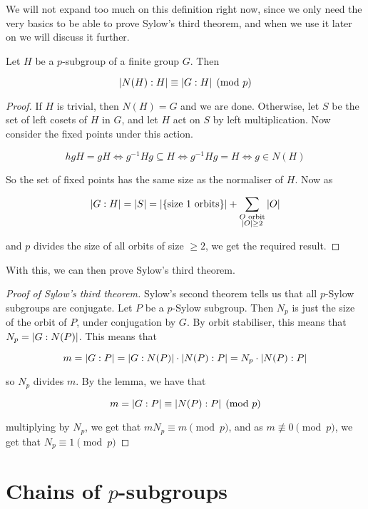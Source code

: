 \documentclass{article}
\begin{document}
    We will not expand too much on this definition right now, since we only need the very basics to be able to prove Sylow's third theorem, and when we use it later on we will discuss it further.

    \begin{lemma*}
        Let $H$ be a $p$-subgroup of a finite group $G$. Then

        $$\abs{N(H) : H} \equiv \abs{G : H} \pmod p$$
    \end{lemma*}

    \begin{proof}
        If $H$ is trivial, then $N(H) = G$ and we are done. Otherwise, let $S$ be the set of left cosets of $H$ in $G$, and let $H$ act on $S$ by left multiplication. Now consider the fixed points under this action.

        $$hgH = gH \iff g^{-1}Hg \subseteq H \iff g^{-1}Hg = H \iff g \in N(H)$$

        So the set of fixed points has the same size as the normaliser of $H$. Now as

        $$\abs{G : H} = \abs{S} = \abs{\{\text{size }1\text{ orbits}\}} + \sum_{\substack{O \text{ orbit} \\ \abs{O} \ge 2}}\abs{O}$$

        and $p$ divides the size of all orbits of size $\ge 2$, we get the required result.
    \end{proof}

    With this, we can then prove Sylow's third theorem.

    \begin{proof}
        [Proof of Sylow's third theorem] Sylow's second theorem tells us that all $p$-Sylow subgroups are conjugate. Let $P$ be a $p$-Sylow subgroup. Then $N_p$ is just the size of the orbit of $P$, under conjugation by $G$. By orbit stabiliser, this means that $N_p = \abs{G : N(P)}$. This means that

        $$m = \abs{G : P} = \abs{G : N(P)} \cdot \abs{N(P) : P} = N_p \cdot \abs{N(P) : P}$$

        so $N_p$ divides $m$. By the lemma, we have that

        $$m = \abs{G : P} \equiv \abs{N(P) : P} \pmod p$$

        multiplying by $N_p$, we get that $mN_p \equiv m \pmod p$, and as $m \not\equiv 0 \pmod p$, we get that $N_p \equiv 1 \pmod p$
    \end{proof}

    \section{Chains of $p$-subgroups}
\end{document}
